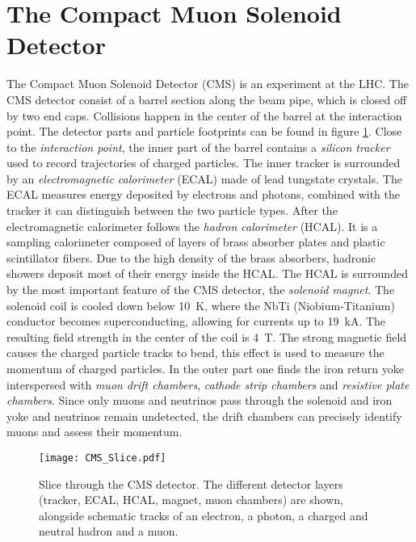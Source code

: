 \section{The Compact Muon Solenoid Detector}
The Compact Muon Solenoid Detector (CMS) is an experiment at the LHC. The CMS detector\cite{Co2008CMS} consist of a barrel section along the beam pipe, which is closed off by two end caps. Collisions happen in the center of the barrel at the interaction point. 
The detector parts and particle footprints can be found in figure \ref{fig:cms_slice}.
Close to the \emph{interaction point}, the inner part of the barrel contains a \emph{silicon tracker} used to record trajectories of charged particles. 
The inner tracker is surrounded by an \emph{electromagnetic calorimeter} (ECAL) made of lead tungstate crystals. The ECAL measures energy deposited by electrons and photons, combined with the tracker it can distinguish between the two particle types. 
After the electromagnetic calorimeter follows the \emph{hadron calorimeter} (HCAL). It is a sampling calorimeter composed of layers of brass absorber plates and plastic scintillator fibers. Due to the high density of the brass absorbers, hadronic showers deposit most of their energy inside the HCAL.
The HCAL is surrounded by the most important feature of the CMS detector, the \emph{solenoid magnet}. The solenoid coil is cooled down below \SI{10}{\kelvin}, where the NbTi (Niobium-Titanium) conductor becomes superconducting, allowing for currents up to \SI{19}{\kilo\ampere}. The resulting field strength in the center of the coil is \SI{4}{\tesla}. The strong magnetic field causes the charged particle tracks to bend, this effect is used to measure the momentum of charged particles.
In the outer part one finds the iron return yoke interspersed with \emph{muon drift chambers}, \emph{cathode strip chambers} and \emph{resistive plate chambers}. Since only muons and neutrinos pass through the solenoid and iron yoke and neutrinos remain undetected, the drift chambers can precisely identify muons and assess their momentum.

\begin{figure}
	\centering
	\texttt{[image: CMS\_Slice.pdf]}
	\caption{Slice through the CMS detector. The different detector layers (tracker, ECAL, HCAL, magnet, muon chambers) are shown, alongside schematic tracks of an electron, a photon, a charged and neutral hadron and a muon.\cite[modified]{Barney2011CMS}}
	\label{fig:cms_slice}
\end{figure}

